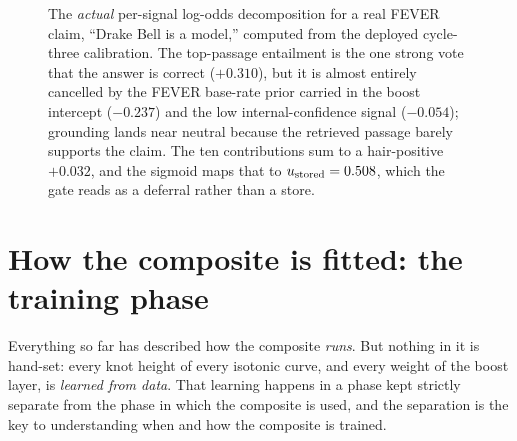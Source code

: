 \begin{figure}[htbp]
\centering
{}
\caption[Signals voting in log-odds space]{The \emph{actual} per-signal log-odds
decomposition for a real FEVER claim, ``Drake Bell is a model,'' computed from the
deployed cycle-three calibration. The top-passage entailment is the one strong vote
that the answer is correct ($+0.310$), but it is almost entirely cancelled by the
FEVER base-rate prior carried in the boost intercept ($-0.237$) and the low
internal-confidence signal ($-0.054$); grounding lands near neutral because the
retrieved passage barely supports the claim. The ten contributions sum to a
hair-positive $+0.032$, and the sigmoid maps that to $u_{\text{stored}} = 0.508$, which the
gate reads as a deferral rather than a store.}
\label{fig:logodds}
\end{figure}

\section{How the composite is fitted: the training phase}
\label{sec:composite-training}

Everything so far has described how the composite \emph{runs}. But nothing in it is
hand-set: every knot height of every isotonic curve, and every weight of the boost
layer, is \emph{learned from data}. That learning happens in a phase kept strictly
separate from the phase in which the composite is used, and the separation is the
key to understanding when and how the composite is trained.

